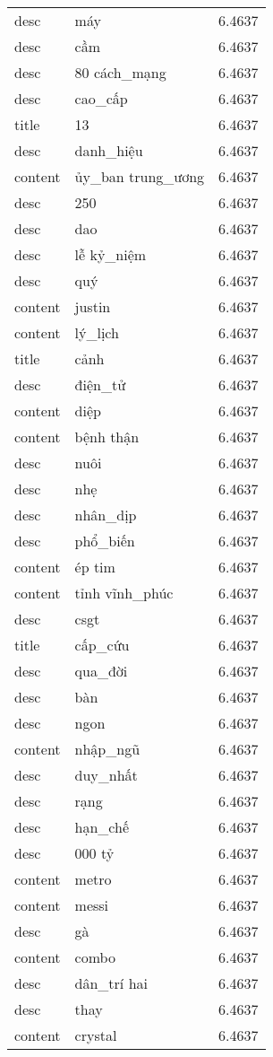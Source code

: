 \documentclass{article}
\begin{document}
\begin{tabular}{lll}
desc & máy & 6.4637\\
desc & cầm & 6.4637\\
desc & 80 cách\_mạng & 6.4637\\
desc & cao\_cấp & 6.4637\\
title & 13 & 6.4637\\
desc & danh\_hiệu & 6.4637\\
content & ủy\_ban trung\_ương & 6.4637\\
desc & 250 & 6.4637\\
desc & dao & 6.4637\\
desc & lễ kỷ\_niệm & 6.4637\\
desc & quý & 6.4637\\
content & justin & 6.4637\\
content & lý\_lịch & 6.4637\\
title & cảnh & 6.4637\\
desc & điện\_tử & 6.4637\\
content & diệp & 6.4637\\
content & bệnh thận & 6.4637\\
desc & nuôi & 6.4637\\
desc & nhẹ & 6.4637\\
desc & nhân\_dịp & 6.4637\\
desc & phổ\_biến & 6.4637\\
content & ép tim & 6.4637\\
content & tỉnh vĩnh\_phúc & 6.4637\\
desc & csgt & 6.4637\\
title & cấp\_cứu & 6.4637\\
desc & qua\_đời & 6.4637\\
desc & bàn & 6.4637\\
desc & ngon & 6.4637\\
content & nhập\_ngũ & 6.4637\\
desc & duy\_nhất & 6.4637\\
desc & rạng & 6.4637\\
desc & hạn\_chế & 6.4637\\
desc & 000 tỷ & 6.4637\\
content & metro & 6.4637\\
content & messi & 6.4637\\
desc & gà & 6.4637\\
content & combo & 6.4637\\
desc & dân\_trí hai & 6.4637\\
desc & thay & 6.4637\\
content & crystal & 6.4637\\

\end{tabular}
\end{document}
